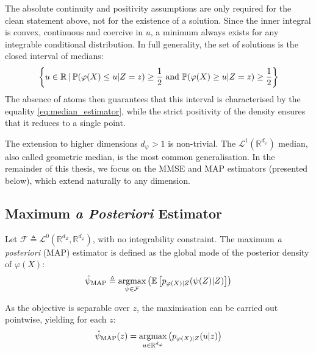 \begin{remark}
	The absolute continuity and positivity assumptions are only required for the clean statement above, not for the existence of a solution. Since the inner integral is convex, continuous and coercive in $u$, a minimum always exists for any integrable conditional distribution. In full generality, the set of solutions is the closed interval of medians:
	\begin{equation}
		\left\{u\in\mathbb{R}\:|\:\mathbb{P}(\varphi(X)\leq u|Z=z)\geq\frac{1}{2}\textup{ and }\mathbb{P}(\varphi(X)\geq u|Z=z)\geq\frac{1}{2}\right\}
	\end{equation}
	The absence of atoms then guarantees that this interval is characterised by the equality \eqref{eq:median_estimator}, while the strict positivity of the density ensures that it reduces to a single point.
\end{remark}

\begin{remark}
	The extension to higher dimensions $d_{\varphi}>1$ is non-trivial. The $\mathcal{L}^1\left(\mathbb{R}^{d_{\varphi}}\right)$ median, also called geometric median, is the most common generalisation. In the remainder of this thesis, we focus on the MMSE and MAP estimators (presented below), which extend naturally to any dimension.
\end{remark}

\subsection{Maximum \textit{a Posteriori} Estimator}

Let $\mathcal{F}\triangleq\mathcal{L}^0\left(\mathbb{R}^{d_Z},\mathbb{R}^{d_{\varphi}}\right)$, with no integrability constraint. The maximum \textit{a posteriori} (MAP) estimator is defined as the global mode of the posterior density of $\varphi(X)$:
\begin{equation}
	\hat{\psi}_{\textup{MAP}}\triangleq\underset{\psi\in\mathcal{F}}{\textup{argmax}}\left(\mathbb{E}\left[p_{\varphi(X)|Z}(\psi(Z)|Z)\right]\right)
\end{equation}

As the objective is separable over $z$, the maximisation can be carried out pointwise, yielding for each $z$:
\begin{equation}
	\hat{\psi}_{\textup{MAP}}(z)=\underset{u\in\mathbb{R}^{d_{\varphi}}}{\textup{argmax}}\left(p_{\varphi(X)|Z}(u|z)\right)
\end{equation}

